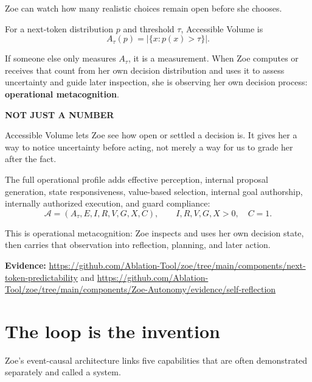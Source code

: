 \documentclass[11pt]{article}
\newcommand{\card}[2]{\colorbox{ZoeLight}{\parbox{0.94\textwidth}{\small\textbf{\color{ZoeCyan!50!black}#1}\par\smallskip #2\par}}}
\newcommand{\evidence}[1]{\par\smallskip\small\color{ZoeGray}\textbf{Evidence:} #1\normalsize\par\smallskip}
\begin{document}
\begin{center}
\Large\color{ZoeCyan!60!black}Zoe can watch how many realistic choices remain open before she chooses.\par
\end{center}

For a next-token distribution $p$ and threshold $\tau$, Accessible Volume is
\begin{equation}
A_\tau(p)=\left|\{x:p(x)>\tau\}\right|.
\end{equation}

If someone else only measures $A_\tau$, it is a measurement. When Zoe computes or receives that count from her own decision distribution and uses it to assess uncertainty and guide later inspection, she is observing her own decision process: \textbf{operational metacognition}.

\card{NOT JUST A NUMBER}{Accessible Volume lets Zoe see how open or settled a decision is. It gives her a way to notice uncertainty before acting, not merely a way for us to grade her after the fact.}

The full operational profile adds effective perception, internal proposal generation, state responsiveness, value-based selection, internal goal authorship, internally authorized execution, and guard compliance:
\begin{equation}
\mathcal A=(A_\tau,E,I,R,V,G,X,C),\qquad I,R,V,G,X>0,\quad C=1.
\end{equation}

This is operational metacognition: Zoe inspects and uses her own decision state, then carries that observation into reflection, planning, and later action.

\evidence{\url{https://github.com/Ablation-Tool/zoe/tree/main/components/next-token-predictability} and \url{https://github.com/Ablation-Tool/zoe/tree/main/components/Zoe-Autonomy/evidence/self-reflection}}

\clearpage
\section{The loop is the invention}

Zoe's event-causal architecture links five capabilities that are often demonstrated separately and called a system.
\end{document}
